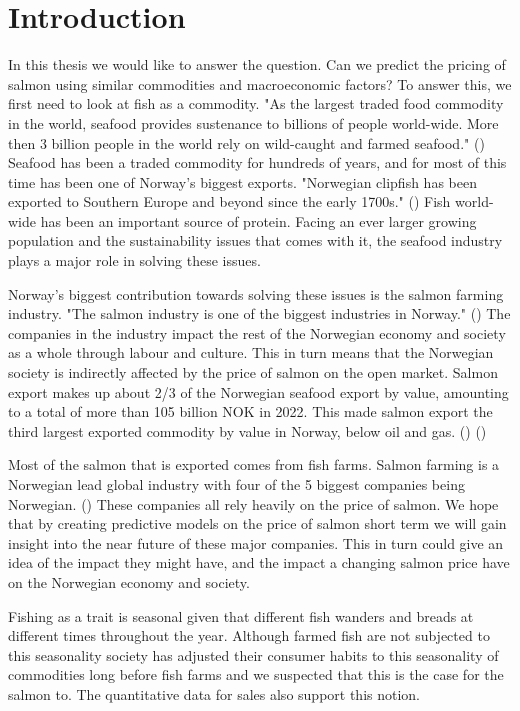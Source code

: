 \section{Introduction}

In this thesis we would like to answer the question. 
Can we predict the pricing of salmon using similar commodities and macroeconomic factors? To answer this, we first need to look at fish as a commodity. "As the largest traded food commodity in the world, seafood provides sustenance to billions of people world-wide. More then 3 billion people in the world rely on wild-caught and farmed seafood." (\cite{wwf_2019}) Seafood has been a traded commodity for hundreds of years, and for most of this time has been one of Norway's biggest exports. "Norwegian clipfish has been exported to Southern Europe and beyond since the early 1700s." (\cite{seafood_from_norway_clipfish}) Fish world-wide has been an important source of protein. Facing an ever larger growing population and the sustainability issues that comes with it, the seafood industry plays a major role in solving these issues.

Norway's biggest contribution towards solving these issues is the salmon farming industry. "The salmon industry is one of the biggest industries in Norway." (\cite{Johansen_et_al_2019}) The companies in the industry impact the rest of the Norwegian economy and society as a whole through labour and culture. This in turn means that the Norwegian society is indirectly affected by the price of salmon on the open market. Salmon export makes up about 2/3 of the Norwegian seafood export by value, amounting to a total of more than 105 billion NOK in 2022. This made salmon export the third largest exported commodity by value in Norway, below oil and gas. (\cite{e24_gasprice_2023}) (\cite{seafood_nokkeltall})

Most of the salmon that is exported comes from fish farms. Salmon farming is a Norwegian lead global industry with four of the 5 biggest companies being Norwegian. (\cite{ilaks_2020}) These companies all rely heavily on the price of salmon. We hope that by creating predictive models on the price of salmon short term we will gain insight into the near future of these major companies. This in turn could give an idea of the impact they might have, and the impact a changing salmon price have on the Norwegian economy and society.

Fishing as a trait is seasonal given that different fish wanders and breads at different times throughout the year. Although farmed fish are not subjected to this seasonality society has adjusted their consumer habits to this seasonality of commodities long before fish farms and we suspected that this is the case for the salmon to. The quantitative data for sales also support this notion.

